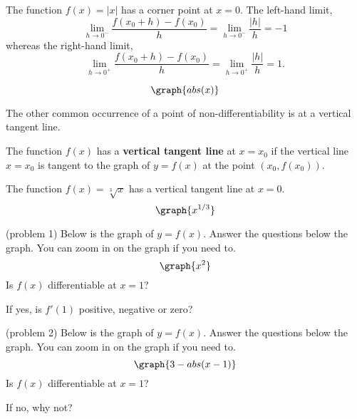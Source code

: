 \documentclass[handout]{ximera}
\begin{document}
\begin{example}[example 1]
The function $f(x) = |x|$ has a corner point at $x = 0$.
The left-hand limit, 
\[
\lim_{h\to 0^-} \frac{f(x_0 +h)-f(x_0)}{h} = \lim_{h\to 0^-} \frac{|h|}{h} = -1
\]
whereas the right-hand limit,
\[
\lim_{h\to 0^+} \frac{f(x_0 +h)-f(x_0)}{h} = \lim_{h\to 0^+} \frac{|h|}{h} = 1.
\]

\[
\graph{abs(x)}
\]
\end{example}

The other common occurrence of a point of non-differentiability is at a vertical tangent line.


\begin{definition} The function $f(x)$ has a \textbf{vertical tangent line} at $x = x_0$ if
the vertical line $x = x_0$ is tangent to the graph of $y = f(x)$ at the point $(x_0, f(x_0))$.
\end{definition}

\begin{example}[example 2]
The function $f(x) = \sqrt[3] x$ has a vertical tangent line at $x = 0$.
\[
\graph{x^{1/3}}
\]
\end{example}


\begin{problem}(problem 1)
Below is the graph of $y = f(x)$.  Answer the questions below the graph.  You can zoom in on the graph if you need to.
\[
\graph{x^2}
\]
Is $f(x)$ differentiable at $x = 1$?
\begin{multipleChoice}
\end{multipleChoice}
If yes, is $f'(1)$ positive, negative or zero?
\begin{multipleChoice}
\end{multipleChoice}
\end{problem}




\begin{problem}(problem 2)
Below is the graph of $y = f(x)$.  Answer the questions below the graph.  You can zoom in on the graph if you need to.
\[
\graph{3-abs(x-1)}
\]
Is $f(x)$ differentiable at $x = 1$?
\begin{multipleChoice}
\end{multipleChoice}
If no, why not?
\begin{multipleChoice}
\end{multipleChoice}
\end{problem}
\end{document}
